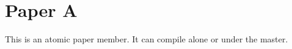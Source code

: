 \documentclass[master.tex]{subfiles}
\begin{document}
\section{Paper A}
This is an atomic paper member. It can compile alone or under the master.
\end{document}
